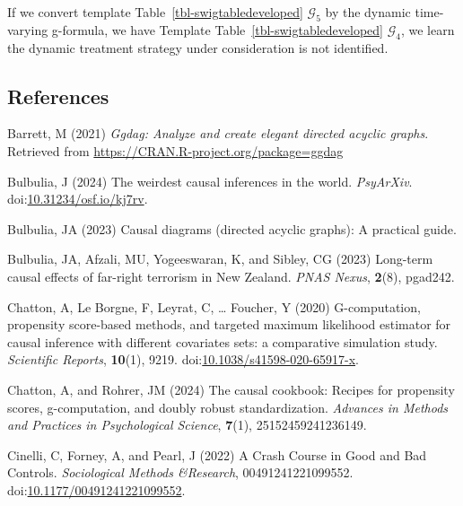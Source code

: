 \documentclass[
  single column]{article}
\newlength{\cslhangindent}
\newenvironment{CSLReferences}[2] %
 {\begin{list}{}{%
  \setlength{\itemindent}{0pt}
  \setlength{\leftmargin}{0pt}
  \setlength{\parsep}{0pt}
  \ifodd #1
   \setlength{\leftmargin}{\cslhangindent}
   \setlength{\itemindent}{-1\cslhangindent}
  \fi
  \setlength{\itemsep}{#2\baselineskip}}}
 {\end{list}}
\begin{document}
If we convert template Table~\ref{tbl-swigtabledeveloped}
\(\mathcal{G}_5\) by the dynamic time-varying g-formula, we have
Template Table~\ref{tbl-swigtabledeveloped} \(\mathcal{G}_4\), we learn
the dynamic treatment strategy under consideration is not identified.

\newpage{}

\subsection{References}\label{references}

\label{refs}
\begin{CSLReferences}{1}{0}
Barrett, M (2021) \emph{Ggdag: Analyze and create elegant directed
acyclic graphs}. Retrieved from
\url{https://CRAN.R-project.org/package=ggdag}

Bulbulia, J (2024) The weirdest causal inferences in the world.
\emph{PsyArXiv}.
doi:\href{https://doi.org/10.31234/osf.io/kj7rv}{10.31234/osf.io/kj7rv}.

Bulbulia, JA (2023) Causal diagrams (directed acyclic graphs): A
practical guide.

Bulbulia, JA, Afzali, MU, Yogeeswaran, K, and Sibley, CG (2023)
Long-term causal effects of far-right terrorism in {N}ew {Z}ealand.
\emph{PNAS Nexus}, \textbf{2}(8), pgad242.

Chatton, A, Le Borgne, F, Leyrat, C, \ldots{} Foucher, Y (2020)
G-computation, propensity score-based methods, and targeted maximum
likelihood estimator for causal inference with different covariates
sets: a comparative simulation study. \emph{Scientific Reports},
\textbf{10}(1), 9219.
doi:\href{https://doi.org/10.1038/s41598-020-65917-x}{10.1038/s41598-020-65917-x}.

Chatton, A, and Rohrer, JM (2024) The causal cookbook: Recipes for
propensity scores, g-computation, and doubly robust standardization.
\emph{Advances in Methods and Practices in Psychological Science},
\textbf{7}(1), 25152459241236149.

Cinelli, C, Forney, A, and Pearl, J (2022) A Crash Course in Good and
Bad Controls. \emph{Sociological Methods \&Research}, 00491241221099552.
doi:\href{https://doi.org/10.1177/00491241221099552}{10.1177/00491241221099552}.


\end{CSLReferences}
\end{document}
